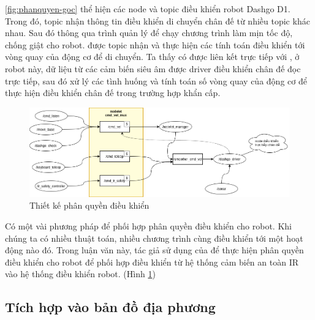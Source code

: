 \figurename{ \ref{fig:phanquyen-goc}} thể hiện các node và topic điều khiển robot Dashgo D1. Trong đó, topic  nhận thông tin điều khiển di chuyển chân đế từ nhiều topic khác nhau. Sau đó thông qua trình quản lý  để chạy chương trình làm mịn tốc độ, chống giật cho robot.  được topic  nhận và thực hiện các tính toán điều khiển tới vòng quay của động cơ để di chuyển.
Ta thấy có  được liên kết trực tiếp với , ở robot này, dữ liệu từ các cảm biến siêu âm được driver điều khiển chân đế đọc trực tiếp, sau đó xử lý các tình huống và tính toán số vòng quay của động cơ để thực hiện điều khiển chân đế trong trường hợp khẩn cấp.


\begin{figure}[htbp]
    \centering
    \includegraphics[width=\linewidth]{figures/phanquen-dexuat.png}
    \caption{Thiết kế phân quyền điều khiển}
    \label{fig:phanquen-dexuat}
\end{figure}

Có một vài phương pháp để phối hợp phân quyền điều khiển cho robot. Khi chúng ta có nhiều thuật toán, nhiều chương trình cùng điều khiển tới một hoạt động nào đó.
Trong luận văn này, tác giả sử dụng  của  để thực hiện phân quyền điều khiển cho robot để phối hợp điều khiển từ hệ thống cảm biến an toàn IR vào hệ thống điều khiển robot. (Hình \ref{fig:phanquen-dexuat})

\subsection{Tích hợp vào bản đồ địa phương}


